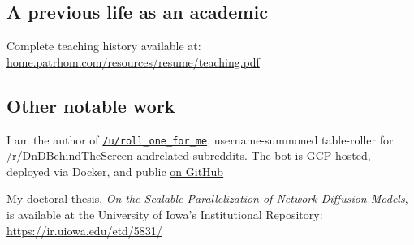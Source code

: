 \documentclass[10pt,letterpaper]{article}
\newcommand\ttt\texttt
\renewenvironment{itemize}{
  \begin{list}{}{
    \setlength{\leftmargin}{1.5em}
    \setlength{\itemsep}{0.25em}
    \setlength{\parskip}{0pt}
    \setlength{\parsep}{0.25em}
  }
}{
  \end{list}
}
\begin{document}
\subsection*{A previous life as an academic}
\begin{itemize}
  \item

  \item

  \item

  \item

  \item Complete teaching history available at: \url{home.patrhom.com/resources/resume/teaching.pdf}
\end{itemize}

\subsection*{Other notable work}
\begin{itemize}
  \item I am the author of \href{https://www.reddit.com/user/roll_one_for_me}{\ttt{/u/roll\_one\_for\_me}},
    username-summoned table-roller for /r/DnDBehindTheScreen andrelated subreddits.
    The bot is GCP-hosted, deployed via Docker,
    and public \href{https://github.com/PurelyApplied/roll_one_for_me/}{on GitHub}

  \item My doctoral thesis, {\em On the Scalable Parallelization of Network Diffusion Models},
    is available at the University of Iowa's Institutional Repository:  \url{https://ir.uiowa.edu/etd/5831/}
\end{itemize}
\end{document}
